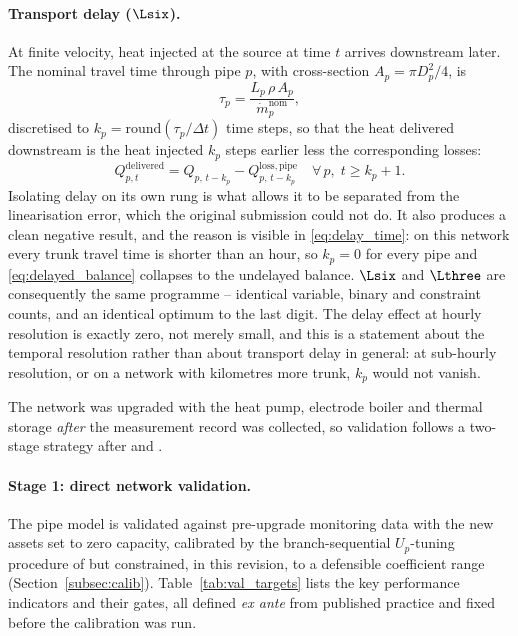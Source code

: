 \paragraph{Transport delay ($\Lsix$).}
At finite velocity, heat injected at the source at time $t$ arrives downstream later. The
nominal travel time through pipe $p$, with cross-section $A_p = \pi D_p^2/4$, is
%
\begin{equation}
  \tau_p = \frac{L_p\, \rho\, A_p}{\dot{m}_p^{\mathrm{nom}}},
  \label{eq:delay_time}
\end{equation}
%
discretised to $k_p = \mathrm{round}(\tau_p/\Delta t)$ time steps, so that the heat
delivered downstream is the heat injected $k_p$ steps earlier less the corresponding
losses:
%
\begin{equation}
  Q_{p,t}^{\mathrm{delivered}} =
    Q_{p,\,t-k_p} - Q_{p,\,t-k_p}^{\mathrm{loss,pipe}}
  \quad \forall\, p,\; t \geq k_p{+}1.
  \label{eq:delayed_balance}
\end{equation}
%
Isolating delay on its own rung is what allows it to be separated from the linearisation
error, which the original submission could not do. It also produces a clean negative
result, and the reason is visible in \eqref{eq:delay_time}: on this network every trunk
travel time is shorter than an hour, so $k_p = 0$ for every pipe and
\eqref{eq:delayed_balance} collapses to the undelayed balance. $\Lsix$ and $\Lthree$ are
consequently the same programme -- identical variable, binary and constraint counts, and
an identical optimum to the last digit. The delay effect at hourly resolution is exactly
zero, not merely small, and this is a statement about the temporal resolution rather than
about transport delay in general: at sub-hourly resolution, or on a network with
kilometres more trunk, $k_p$ would not vanish.


The network was upgraded with the heat pump, electrode boiler and thermal storage
\emph{after} the measurement record was collected, so validation follows a two-stage
strategy after \citet{Kus2025} and \citet{Maldonado2024}.

\paragraph{Stage 1: direct network validation.}
The pipe model is validated against pre-upgrade monitoring data with the new assets set to
zero capacity, calibrated by the branch-sequential $U_p$-tuning procedure of
\citet{Maldonado2024} but constrained, in this revision, to a defensible coefficient range
(Section~\ref{subsec:calib}). Table~\ref{tab:val_targets} lists the key performance
indicators and their gates, all defined \emph{ex ante} from published practice and fixed
before the calibration was run.

